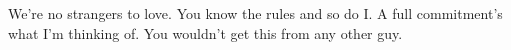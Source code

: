 \documentclass[preview]{standalone}
\begin{document}
\begin{center}
\parbox{20em}{We're no strangers to love.
            You know the rules and so do I.
            A full commitment's what I'm thinking of.
            You wouldn't get this from any other guy.}
\end{center}
\end{document}
